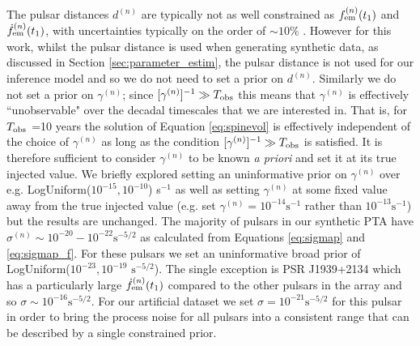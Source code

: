 \documentclass[fleqn,usenatbib,useAMS]{mnras}
\begin{document}
The pulsar distances $d^{(n)}$ are typically not as well constrained as $f_{\rm em}^{(n)} (t_1)$ and $\dot{f}_{\rm em}^{(n)} (t_1)$, with uncertainties typically on the order of $\sim 10 \%$ \citep{Arzoumanian2018ApJS..235...37A,Yao2017}. However for this work, whilst the pulsar distance is used when generating synthetic data, as discussed in Section \ref{sec:parameter_estim}, the pulsar distance is not used for our inference model and so we do not need to set a prior on $d^{(n)}$. Similarly we do not set a prior on $\gamma^{(n)}$; since $[\gamma^{(n)}]^{-1} \gg T_{\rm obs}$ this means that $\gamma^{(n)}$ is effectively ``unobservable" over the decadal timescales that we are interested in. That is, for $T_{\rm obs}$ =10 years the solution of Equation \eqref{eq:spinevol} is effectively independent of the choice of $\gamma^{(n)}$ as long as the condition $[\gamma^{(n)}]^{-1} \gg T_{\rm obs}$ is satisfied. It is therefore sufficient to consider $\gamma^{(n)}$ to be known \textit{a priori} and set it at its true injected value. We briefly explored setting an uninformative prior on $\gamma^{(n)}$ over e.g. LogUniform($10^{-15}, 10^{-10}$) s$^{-1}$ as well as setting $\gamma^{(n)}$ at some fixed value away from the true injected value (e.g. set $\gamma^{(n)} = 10^{-14} \text{s}^{-1}$ rather than $10^{-13} \text{s}^{-1}$) but the results are unchanged. The majority of pulsars in our synthetic PTA have $\sigma^{(n)} \sim 10^{-20} - 10^{-22} \text{s}^{-5/2}$ as calculated from Equations \eqref{eq:sigmap} and \eqref{eq:sigmap_f}. For these pulsars we set an uninformative broad prior of LogUniform($10^{-23}, 10^{-19}$ $\text{s}^{-5/2}$). The single exception is PSR J1939+2134 which has a particularly large $\dot{f}_{\rm em}^{(n)} (t_1)$ compared to the other pulsars in the array and so $\sigma \sim 10^{-16} \text{s}^{-5/2}$. For our artificial dataset we set $\sigma = 10^{-21} \text{s}^{-5/2}$ for this pulsar in order to bring the process noise for all pulsars into a consistent range that can be described by a single constrained prior. \newline 
\end{document}
